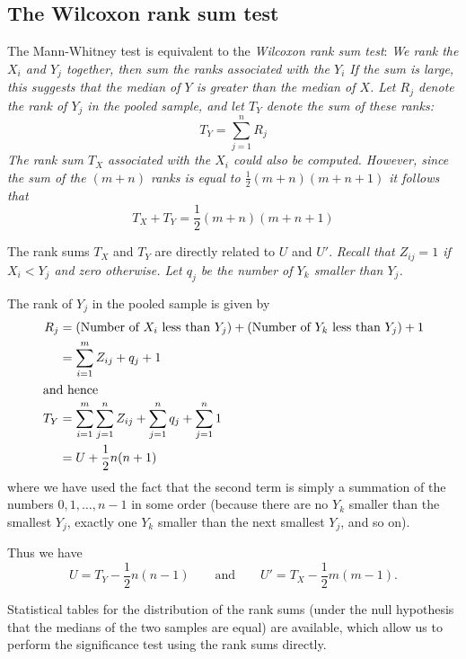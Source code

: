 %
\subsection{The Wilcoxon rank sum test}
The Mann-Whitney test is equivalent to the \emph{Wilcoxon rank sum test}: 
\bit
\it We rank the $X_i$ and $Y_j$ together, then sum the ranks associated with the $Y_i$ 
\it If the sum is large, this suggests that the median of $Y$ is greater than the median of $X$.
\it Let $R_j$ denote the rank of $Y_j$ in the pooled sample, and let $T_Y$ denote the sum of these ranks:
\[
T_Y = \sum_{j=1}^n R_j
\]
\it The rank sum $T_X$ associated with the $X_i$ could also be computed. However, since the sum of the $(m+n)$ ranks is equal to $\frac{1}{2}(m+n)(m+n+1)$ it follows that
\[
T_X + T_Y = \frac{1}{2}(m+n)(m+n+1)
\]
\eit

The rank sums $T_X$ and $T_Y$ are directly related to $U$ and $U'$.
\bit
\it Recall that $Z_{ij}=1$ if $X_i<Y_j$ and zero otherwise.
\it Let $q_j$ be the number of $Y_k$ smaller than $Y_j$.
\eit

The rank of $Y_j$ in the pooled sample is given by
\begin{align*}
R_j	
	& = \text{(Number of $X_i$ less than $Y_j$)} + \text{(Number of $Y_k$ less than $Y_j$)} + 1 \\
	& = \sum_{i=1}^m Z_{ij} + q_j + 1 \\
\intertext{and hence}
T_Y
	& = 	\sum_{i=1}^m\sum_{j=1}^n Z_{ij} + \sum_{j=1}^n q_j + \sum_{j=1}^n 1 \\
	& = U + \frac{1}{2}n(n+1)
\end{align*}
where we have used the fact that the second term is simply a summation of the numbers $0,1,\ldots, n-1$ in some order (because there are no $Y_k$ smaller than the smallest $Y_j$, exactly one $Y_k$ smaller than the next smallest $Y_j$, and so on). 

Thus we have
\[
U = T_Y - \frac{1}{2}n(n-1) \qquad\text{and}\qquad U' = T_X - \frac{1}{2}m(m-1).
\]

Statistical tables for the distribution of the rank sums (under the null hypothesis that the medians of the two samples are equal) are available, which allow us to perform the significance test using the rank sums directly.


